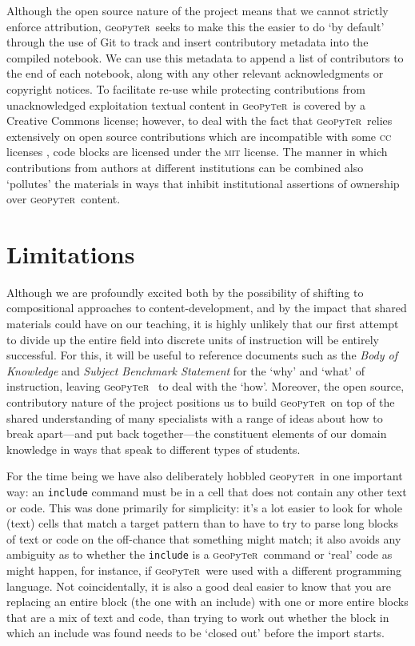 \documentclass[letter, 11pt,titlepage]{article}
\newcommand{\gp}{\textsc{g}eo\textsc{p}y\textsc{t}e\textsc{r}~\/}
\begin{document}
Although the open source nature of the project means that we cannot strictly
enforce attribution, \gp seeks to make this the easier to do `by default'
through the use of Git to track and insert contributory metadata into the
compiled notebook. We can use this metadata to append a list of contributors to
the end of each notebook, along with any other relevant acknowledgments or
copyright notices. To facilitate re-use while protecting contributions from
unacknowledged exploitation textual content in \gp is covered by a Creative
Commons license; however, to deal with the fact that \gp relies extensively on
open source contributions which are incompatible with some \textsc{cc} licenses
\citep[see discussion in][]{osswatch2013}, code blocks are licensed under the
\textsc{mit} license. The manner in which contributions from authors at
different institutions can be combined also `pollutes' the materials in ways
that inhibit institutional assertions of ownership over \gp content.

\section{Limitations}\label{limitations}

Although we are profoundly excited both by the possibility of shifting to
compositional approaches to content-development, and by the impact that shared
materials could have on our teaching, it is highly unlikely that our first
attempt to divide up the entire field into discrete units of instruction will be
entirely successful. For this, it will be useful to reference documents such as
the \textit{Body of Knowledge} \citep{bok2018} and \textit{Subject Benchmark
Statement} \citep{QAA2014} for the `why' and `what' of instruction, leaving \gp
to deal with the `how'. Moreover, the open source, contributory nature of the
project positions us to build \gp on top of the shared understanding of many
specialists with a range of ideas about how to break apart---and put back
together---the constituent elements of our domain knowledge in ways that speak
to different types of students.

For the time being we have also deliberately hobbled \gp in one important way:
an \texttt{include} command must be in a cell that does not contain any other
text or code. This was done primarily for simplicity: it's a lot easier to look
for whole (text) cells that match a target pattern than to have to try to parse
long blocks of text or code on the off-chance that something might match; it
also avoids any ambiguity as to whether the \texttt{include} is a \gp command or
`real' code as might happen, for instance, if \gp were used with a different
programming language. Not coincidentally, it is also a good deal easier to know
that you are replacing an entire block (the one with an include) with one or
more entire blocks that are a mix of text and code, than trying to work out
whether the block in which an include was found needs to be `closed out' before
the import starts.
\end{document}
